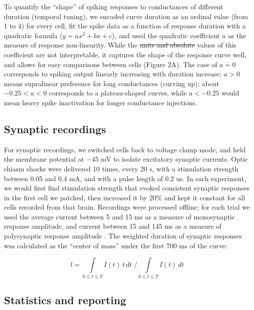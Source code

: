 \documentclass{article}
\providecommand{\DIFaddtex}[1]{{\protect\color{blue}{#1}}} %
\providecommand{\DIFdeltex}[1]{{\protect\color{red}\sout{#1}}}                      %
\providecommand{\DIFaddbegin}{} %
\providecommand{\DIFaddend}{} %
\providecommand{\DIFdelbegin}{} %
\providecommand{\DIFdelend}{} %
\providecommand{\DIFadd}[1]{\texorpdfstring{\DIFaddtex{#1}}{#1}} %
\providecommand{\DIFdel}[1]{\texorpdfstring{\DIFdeltex{#1}}{}} %
\newcommand{\DIFscaledelfig}{0.5}
\newlength{\DIFdelgraphicswidth} %
\newlength{\DIFdelgraphicsheight} %
\newcommand{\DIFaddincludegraphics}[2][]{{\color{blue}\fbox{\DIFOincludegraphics[#1]{#2}}}} %
\newcommand{\DIFdelincludegraphics}[2][]{%
\sbox{\DIFdelgraphicsbox}{\DIFOincludegraphics[#1]{#2}}%
\settoboxwidth{\DIFdelgraphicswidth}{\DIFdelgraphicsbox} %
\settoboxtotalheight{\DIFdelgraphicsheight}{\DIFdelgraphicsbox} %
\scalebox{\DIFscaledelfig}{%
\parbox[b]{\DIFdelgraphicswidth}{\usebox{\DIFdelgraphicsbox}\\[-\baselineskip] \rule{\DIFdelgraphicswidth}{0em}}\llap{\resizebox{\DIFdelgraphicswidth}{\DIFdelgraphicsheight}{%
\setlength{\unitlength}{\DIFdelgraphicswidth}%
\begin{picture}(1,1)%
\thicklines\linethickness{2pt} %
{\color[rgb]{1,0,0}\put(0,0){\framebox(1,1){}}}%
{\color[rgb]{1,0,0}\put(0,0){\line( 1,1){1}}}%
{\color[rgb]{1,0,0}\put(0,1){\line(1,-1){1}}}%
\end{picture}%
}\hspace*{3pt}}} %
} %
\DeclareRobustCommand{\DIFaddbegin}{\DIFOaddbegin \let\includegraphics\DIFaddincludegraphics} %
\DeclareRobustCommand{\DIFaddend}{\DIFOaddend \let\includegraphics\DIFOincludegraphics} %
\DeclareRobustCommand{\DIFdelbegin}{\DIFOdelbegin \let\includegraphics\DIFdelincludegraphics} %
\DeclareRobustCommand{\DIFdelend}{\DIFOaddend \let\includegraphics\DIFOincludegraphics} %
\begin{document}
To quantify the “shape” of spiking responses to conductances of different duration (temporal tuning), we encoded curve duration as an ordinal value (from 1 to 4) for every cell, fit the spike data as a function of response duration with a quadratic formula ($y = ax^2 + bx +c$), and used the quadratic coefficient $a$ as the measure of response non-linearity. While the \DIFdelbegin \DIFdel{units and absolute }\DIFdelend \DIFaddbegin \DIFadd{numerical }\DIFaddend values of this \DIFaddbegin \DIFadd{dimensionless }\DIFaddend coefficient are not \DIFaddbegin \DIFadd{easily }\DIFaddend interpretable, it captures the shape of the response curve well, and allows for easy comparisons between cells (Figure 2A). The case of $a=0$ corresponds to spiking output linearly increasing with duration increase; $a>0$ means supralinear preference for long conductances (curving up); about $-0.25<a<0$ corresponds to a plateau-shaped curves, while $a<-0.25$ would mean heavy spike inactivation for longer conductance injections. 

\subsection*{Synaptic recordings}

For synaptic recordings, we switched cells back to voltage clamp mode, and held the membrane potential at $-$45 mV to isolate excitatory synaptic currents. Optic chiasm shocks were delivered 10 times, every 20 s, with a stimulation strength between 0.05 and 0.4 mA, and with a pulse length of 0.2 us. In each experiment, we would first find stimulation strength that evoked consistent synaptic responses in the first cell we patched, then increased it by 20\% and kept it constant for all cells recorded from that brain. Recordings were processed offline; for each trial we used the average current between 5 and 15 ms as a measure of monosynaptic response amplitude, and current between 15 and 145 ms as a measure of polysynaptic response amplitude \citep{ciarleglio2015}. The weighted duration of synaptic responses was calculated as the “center of mass” under the first 700 ms of the curve:

$$\displaystyle l=\int\limits_{0 \leq t \leq T}{I(t)\, t \, dt} \; \Big/ \int\limits_{0 \leq t \leq T}{I(t) \, dt}$$

\subsection*{Statistics and reporting}
\end{document}
